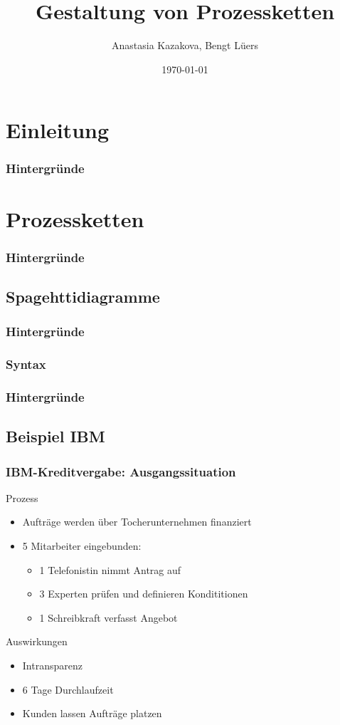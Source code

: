 \documentclass{beamer}
\title{Gestaltung von Prozessketten}
\author[A. Kazakova, B. Lüers]{Anastasia Kazakova, Bengt Lüers}
\institute[Universität Oldenburg]{
  \inst{}Fakultät 2 - Informatik, Wirtschafts- und Rechtswissenschaften}
\date{\today}
\begin{document}
 \frame{\titlepage}


 \section[Einleitung]{Einleitung}
 \begin{frame}
  \frametitle{Hintergründe}
\end{frame}

 \section[Prozessketten]{Prozessketten}
 \begin{frame}
  \frametitle{Hintergründe}
 \end{frame}

 \subsection[Spaghettidiagramme]{Spagehttidiagramme}
 \begin{frame}
  \frametitle{Hintergründe}

 \end{frame}

 \subsubsection[Syntax]{Syntax}
 \begin{frame}
  \frametitle{Hintergründe}

 \end{frame}

 \subsection[Beispiel IBM]{Beispiel IBM}
 \begin{frame}
  \frametitle{IBM-Kreditvergabe: Ausgangssituation}
  Prozess
  \begin{itemize}
    \item Aufträge werden über Tocherunternehmen finanziert
    \item 5 Mitarbeiter eingebunden:
    \begin{itemize}
      \item 1 Telefonistin nimmt Antrag auf
      \item 3 Experten prüfen und definieren Kondititionen
      \item 1 Schreibkraft verfasst Angebot
    \end{itemize}
  \end{itemize}
  Auswirkungen
  \begin{itemize}
    \item Intransparenz
    \item 6 Tage Durchlaufzeit
    \item Kunden lassen Aufträge platzen
  \end{itemize}
 \end{frame}
\end{document}
